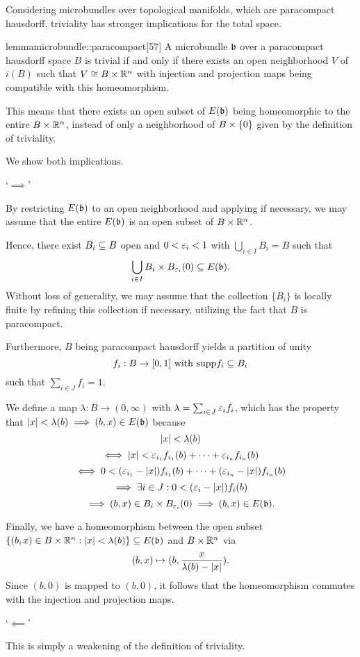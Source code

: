 \begin{myparagraph}
    Considering microbundles over topological manifolds,
    which are paracompact hausdorff,
    triviality has stronger implications for the total space.
\end{myparagraph}

\begin{mystatement}{lemma}{microbundle::paracompact}[57]
    A microbundle $\bb$ over a paracompact hausdorff space $B$ is trivial
    if and only if there exists an open neighborhood $V$ of $i(B)$ such that $V \cong B \times \mathbb{R}^n$
    with injection and projection maps being compatible with this homeomorphism.
\end{mystatement}

\begin{myparagraph}
    This means that there exists an open subset of $E(\bb)$ being homeomorphic to the entire $B \times \mathbb{R}^n$,
    instead of only a neighborhood of $B \times{} \{0\}$ given by the definition of triviality.
\end{myparagraph}

\begin{myproof}
    We show both implications.

    `$\implies$'

    By restricting $E(\bb)$ to an open neighborhood
    and applying  if necessary,
    we may assume that the entire $E(\bb)$ is an open subset of $B \times \mathbb{R}^n$.

    Hence,
    there exist $B_i \subseteq{} B$ open and $0 < \varepsilon{}_i < 1$ with $\bigcup_{i \in I} B_i = B$ such that
    \[ \bigcup_{i \in I } B_i \cross \ball[\eps_i] \sub E(\bb). \]
    Without loss of generality,
    we may assume that the collection $\{B_i\}$ is locally finite by refining this collection if necessary,
    utilizing the fact that $B$ is paracompact.

    Furthermore, $B$ being paracompact hausdorff yields a partition of unity
    \[ f_i: B \to [0, 1] \text{ with } \text{supp}{f_i} \subseteq{} B_i\]
    such that $\sum_{i \in J}f_i = 1$.
    
    We define a map $\lambda: B \to (0, \infty)$ with $\lambda = \sum_{i \in J} \varepsilon{}_i f_i$,
    which has the property that $\abs{x} < \lambda(b) \implies (b, x) \in E(\bb)$ because
    \[ \vert{} x \vert{} < \lambda(b) \]
    \[ \iff  \vert{} x \vert{} < \varepsilon{}_{i_1} f_{i_1}(b) + \cdots + \varepsilon{}_{i_n} f_{i_n}(b) \]
    \[ \iff 0 < (\varepsilon{}_{i_1} - \vert{} x \vert{}) f_{i_1}(b) + \cdots + (\varepsilon{}_{i_n} - \vert{} x \vert{}) f_{i_n}(b) \]
    \[ \implies \exists i \in J: 0 < (\varepsilon{}_{i} - \vert{} x \vert{}) f_{i}(b) \]
    \[ \implies (b, x) \in B_i \cross \ball[\eps_i]  \implies (b, x) \in E(\bb). \]

    Finally, we have a homeomorphism between the open subset
    $\set{(b, x) \in B \cross \R^n}{\abs{x} < \lambda(b)} \sub E(\bb)$ and $B \times \mathbb{R}^n$ via
    \[ (b, x) \mapsto (b, \frac{x}{\lambda(b) - \vert{} x \vert{}}). \]
    Since $(b, 0)$ is mapped to $(b, 0)$, it follows that
    the homeomorphism commutes with the injection and projection maps.

    `$\impliedby$'

    This is simply a weakening of the definition of triviality. 
\end{myproof}